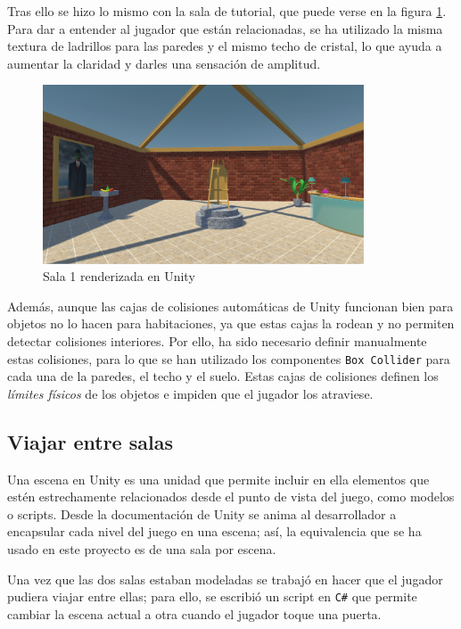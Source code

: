 Tras ello se hizo lo mismo con la sala de tutorial, que puede verse en la figura \ref{fig:unity-sala-1}. Para dar a entender al jugador que están relacionadas, se ha utilizado la misma textura de ladrillos para las paredes y el mismo techo de cristal, lo que ayuda a aumentar la claridad y darles una sensación de amplitud.

\begin{figure}[!h]
\begin{center}
\includegraphics[width=0.85\textwidth]{imagenes/7/salas-unity/unity-sala-1.png}
\caption{Sala 1 renderizada en Unity}
\label{fig:unity-sala-1}
\end{center}
\end{figure}

Además, aunque las cajas de colisiones automáticas de Unity funcionan bien para objetos no lo hacen para habitaciones, ya que estas cajas la rodean y no permiten detectar colisiones interiores. Por ello, ha sido necesario definir manualmente estas colisiones, para lo que se han utilizado los componentes \texttt{Box Collider} para cada una de la paredes, el techo y el suelo. Estas cajas de colisiones definen los \textit{límites físicos} de los objetos e impiden que el jugador los atraviese.

\subsection{Viajar entre salas}

Una escena en Unity es una unidad que permite incluir en ella elementos que estén estrechamente relacionados desde el punto de vista del juego, como modelos o scripts. Desde la documentación de Unity se anima al desarrollador a encapsular cada nivel del juego en una escena; así, la equivalencia que se ha usado en este proyecto es de una sala por escena.

Una vez que las dos salas estaban modeladas se trabajó en hacer que el jugador pudiera viajar entre ellas; para ello, se escribió un script en \texttt{C\#} que permite cambiar la escena actual a otra cuando el jugador toque una puerta.

